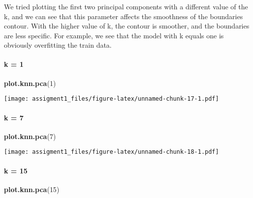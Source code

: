 \documentclass[
]{article}
\newenvironment{Shaded}{\begin{snugshade}}{\end{snugshade}}
\newcommand{\DecValTok}[1]{\textcolor[rgb]{0.00,0.00,0.81}{#1}}
\newcommand{\KeywordTok}[1]{\textcolor[rgb]{0.13,0.29,0.53}{\textbf{#1}}}
\newcommand{\NormalTok}[1]{#1}
\begin{document}
\hypertarget{section-2}{%
\subsubsection{}\label{section-2}}

We tried plotting the first two principal components with a different
value of the k, and we can see that this parameter affects the
smoothness of the boundaries contour. With the higher value of k, the
contour is smoother, and the boundaries are less specific. For example,
we see that the model with k equals one is obviously overfitting the
train data.

\hypertarget{k-1}{%
\paragraph{k = 1}\label{k-1}}

\begin{Shaded}
\begin{Highlighting}[]
\KeywordTok{plot.knn.pca}\NormalTok{(}\DecValTok{1}\NormalTok{)}
\end{Highlighting}
\end{Shaded}

\texttt{[image: assigment1\_files/figure-latex/unnamed-chunk-17-1.pdf]}

\hypertarget{k-7}{%
\paragraph{k = 7}\label{k-7}}

\begin{Shaded}
\begin{Highlighting}[]
\KeywordTok{plot.knn.pca}\NormalTok{(}\DecValTok{7}\NormalTok{)}
\end{Highlighting}
\end{Shaded}

\texttt{[image: assigment1\_files/figure-latex/unnamed-chunk-18-1.pdf]}

\hypertarget{k-15}{%
\paragraph{k = 15}\label{k-15}}

\begin{Shaded}
\begin{Highlighting}[]
\KeywordTok{plot.knn.pca}\NormalTok{(}\DecValTok{15}\NormalTok{)}
\end{Highlighting}
\end{Shaded}
\end{document}
